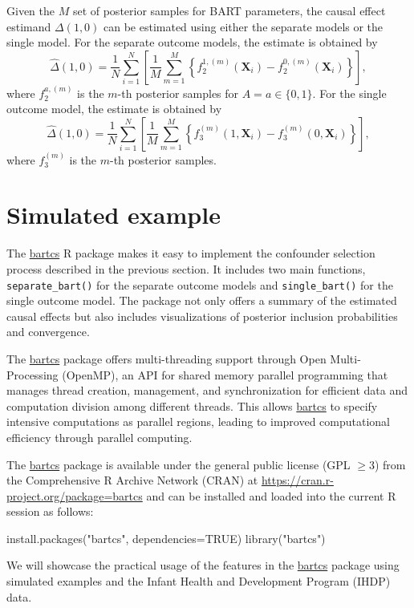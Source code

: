 Given the $M$ set of posterior samples for BART parameters, the causal effect estimand $\Delta(1, 0)$ can be estimated using either the separate models or the single model.
For the separate outcome models, the estimate is obtained by
\[\hat{\Delta}(1,0) = \frac{1}{N} \sum_{i=1}^N\left[\frac{1}{M} \sum_{m=1}^M \left\{f_2^{1,(m)}(\boldsymbol{X}_i) - f_2^{0,(m)}(\boldsymbol{X}_i) \right\}\right],\]
where $f_2^{a,(m)}$ is the $m$-th posterior samples for $A = a\in\{0, 1\}$.
For the single outcome model, the estimate is obtained by
\[\hat{\Delta}(1,0) = \frac{1}{N} \sum_{i=1}^N\left[\frac{1}{M} \sum_{m=1}^M \left\{f_3^{(m)}(1, \boldsymbol{X}_i) - f_3^{(m)}(0, \boldsymbol{X}_i)\right\}\right],\]
where $f_3^{(m)}$ is the $m$-th posterior samples.


\section{Simulated example} \label{sec:simulated}
The \href{https://CRAN.R-project.org/package=bartcs}{bartcs} R package makes it easy to implement the confounder selection process described in the previous section. It includes two main functions, \verb|separate_bart()| for the separate outcome models and \verb|single_bart()| for the single outcome model. The package not only offers a summary of the estimated causal effects but also includes visualizations of posterior inclusion probabilities and convergence.

The \href{https://CRAN.R-project.org/package=bartcs}{bartcs} package offers multi-threading support through Open Multi-Processing (OpenMP), an API for shared memory parallel programming that manages thread creation, management, and synchronization for efficient data and computation division among different threads. This allows \href{https://CRAN.R-project.org/package=bartcs}{bartcs} to specify intensive computations as parallel regions, leading to improved computational efficiency through parallel computing.

The \href{https://CRAN.R-project.org/package=bartcs}{bartcs} package is available under the general public license (GPL $\geq3$) from the Comprehensive R Archive Network (CRAN) at \href{https://CRAN.R-project.org/package=bartcs}{https://cran.r-project.org/package=bartcs} and can be installed and loaded into the current R session as follows:
\begin{example}
install.packages("bartcs", dependencies=TRUE)
library("bartcs")
\end{example}
We will showcase the practical usage of the features in the \href{https://CRAN.R-project.org/package=bartcs}{bartcs} package using simulated examples and the Infant Health and Development Program (IHDP) data.


